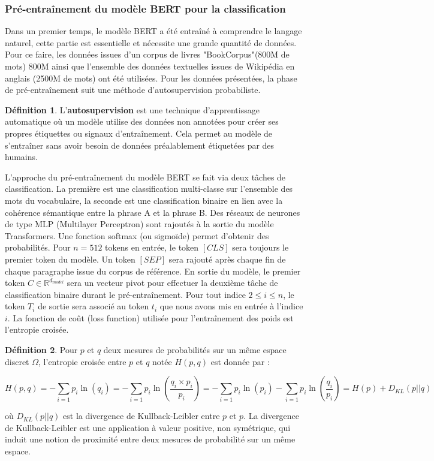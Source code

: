 \documentclass[12pt]{article}
\theoremstyle{definition}
\newtheorem{defi}{Définition}
\begin{document}
\subsubsection{Pré-entraînement du modèle BERT pour la classification}


Dans un premier temps, le modèle BERT a été entraîné à comprendre le langage naturel, cette partie est essentielle et nécessite une grande quantité de données. Pour ce faire, les données issues d’un corpus de livres "BookCorpus"(800M de mots) 800M ainsi que l’ensemble des données textuelles issues de Wikipédia en anglais (2500M de mots) ont été utilisées. Pour les données présentées, la phase de pré-entraînement suit une méthode d'autosupervision probabiliste. \\


\begin{defi} L'\textbf{autosupervision} est une technique d'apprentissage automatique où un modèle utilise des données non annotées pour créer ses propres étiquettes ou signaux d'entraînement. Cela permet au modèle de s'entraîner sans avoir besoin de données préalablement étiquetées par des humains.\\
	
\end{defi}



L'approche du pré-entraînement du modèle BERT se fait via deux tâches de classification. La première est une classification multi-classe sur l’ensemble des mots du vocabulaire, la seconde est une classification binaire en lien avec la cohérence sémantique entre la phrase A et la phrase B. Des réseaux de neurones de type MLP (Multilayer Perceptron) sont rajoutés à la sortie du modèle Transformers. Une fonction softmax (ou sigmoïde) permet d’obtenir des probabilités. Pour $n = 512$ tokens en entrée, le token $[CLS]$ sera toujours le premier token du modèle. Un token $[SEP]$ sera rajouté après chaque fin de chaque paragraphe issue du corpus de référence. En sortie du modèle, le premier token $C\in\mathbb{R}^{d_{model}}$ sera un vecteur pivot pour effectuer la deuxième tâche de classification binaire durant le pré-entraînement. Pour tout indice $2\leq i\leq n$, le token $T_i$ de sortie sera associé au token $t_i$ que nous avons mis en entrée à l'indice $i$. La fonction de coût (loss function) utilisée pour l'entraînement des poids est l'entropie croisée. 

\newpage 

\begin{defi}
	Pour $p$ et $q$ deux mesures de probabilités sur un même espace discret $\Omega$, l'entropie croisée entre $p$ et $q$ notée $H(p,q)$ est donnée par :
	
	$$H(p,q) = - \sum_{i=1}p_i\ln(q_i) = - \sum_{i=1}p_i\ln\left(\dfrac{q_i\times p_i}{p_i}\right) = - \sum_{i=1}p_i\ln(p_i) - \sum_{i=1}p_i\ln\left(\dfrac{q_i}{p_i}\right) = H(p) + D_{KL}\left(p||q\right) $$
	
	où $D_{KL}(p||q)$ est la divergence de Kullback-Leibler entre $p$ et $p$. La divergence de Kullback-Leibler est une application à valeur positive, non symétrique, qui induit une notion de proximité entre deux mesures de probabilité sur un même espace. 
\end{defi} 
\end{document}
